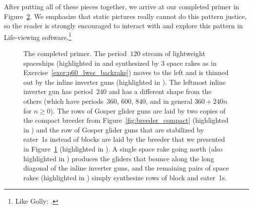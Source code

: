 \clearpage%

\begin{figure}[!htb]
	\centering
	\label{fig:breeder_ggg_eater_1_stabilize}
\end{figure}


After putting all of these pieces together, we arrive at our completed primer in Figure~\ref{fig:primer}. We emphasize that static pictures really cannot do this pattern justice, so the reader is strongly encouraged to interact with and explore this pattern in Life-viewing software.\footnote{Like Golly: .}

\begin{figure}[!htb]
	\centering
	\caption{The completed primer. The period~$120$ stream of lightweight spaceships (highlighted in  and synthesized by $3$ space rakes as in Exercise~\ref{exer:p60_lwss_backrake}) moves to the left and is thinned out by the inline inverter guns (highlighted in ). The leftmost inline inverter gun has period~$240$ and has a different shape from the others (which have periods~$360$, $600$, $840$, and in general $360 + 240n$ for $n \geq 0$). The rows of Gosper glider guns are laid by two copies of the compact breeder from Figure~\ref{fig:breeder_compact} (highlighted in ) and the row of Gosper glider guns that are stabilized by eater~1s instead of blocks are laid by the breeder that we presented in Figure~\ref{fig:breeder_ggg_eater_1_stabilize} (highlighted in ). A single space rake going north (also highlighted in ) produces the gliders that bounce along the long diagonal of the inline inverter guns, and the remaining pairs of space rakes (highlighted in ) simply synthesize rows of block and eater~1s.}
	\label{fig:primer}
\end{figure}



